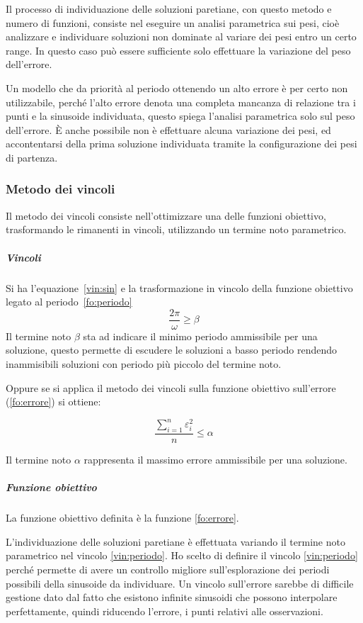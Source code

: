 \documentclass[a4paper,12pt]{report}
\begin{document}
Il processo di individuazione delle soluzioni paretiane, con questo metodo e numero di funzioni, consiste nel eseguire un analisi parametrica sui pesi, cioè analizzare e individuare soluzioni non dominate al variare dei pesi entro un certo range. In questo caso può essere sufficiente solo effettuare la variazione del peso dell'errore.

Un modello che da priorità al periodo ottenendo un alto errore è per certo non utilizzabile, perché l'alto errore denota una completa mancanza di relazione tra i punti e la sinusoide individuata, questo spiega l'analisi parametrica solo sul peso dell'errore. È anche possibile non è effettuare alcuna variazione dei pesi, ed accontentarsi della prima soluzione individuata tramite la configurazione dei pesi di partenza.

\subsubsection{Metodo dei vincoli}
Il metodo dei vincoli consiste nell'ottimizzare una delle funzioni obiettivo, trasformando le rimanenti in vincoli, utilizzando un termine noto parametrico.

\subparagraph{Vincoli} Si ha l'equazione~\eqref{vin:sin} e la trasformazione in vincolo della funzione obiettivo legato al periodo~\eqref{fo:periodo}
\begin{equation}
\label{vin:periodo}
\frac{2\pi}{\omega} \ge \beta
\end{equation}
Il termine noto $ \beta $ sta ad indicare il minimo periodo ammissibile per una soluzione, questo permette di escudere le soluzioni a basso periodo rendendo inammisibili soluzioni con periodo più piccolo del termine noto.

Oppure se si applica il metodo dei vincoli sulla funzione obiettivo sull'errore (\ref{fo:errore}) si ottiene:

\begin{equation}
\label{vin:errore}
\frac{\sum_{i=1}^n \varepsilon_i^2}{n} \le \alpha
\end{equation}

Il termine noto $ \alpha $ rappresenta il massimo errore ammissibile per una soluzione.

\subparagraph{Funzione obiettivo}
La funzione obiettivo definita è la funzione \eqref{fo:errore}.

L'individuazione delle soluzioni paretiane è effettuata variando il termine noto parametrico nel vincolo \eqref{vin:periodo}.
Ho scelto di definire il vincolo \eqref{vin:periodo} perché permette di avere un controllo migliore sull'esplorazione dei periodi possibili della sinusoide da individuare. Un vincolo sull'errore sarebbe di difficile gestione dato dal fatto che esistono infinite sinusoidi che possono interpolare perfettamente, quindi riducendo l'errore, i punti relativi alle osservazioni.
\end{document}
